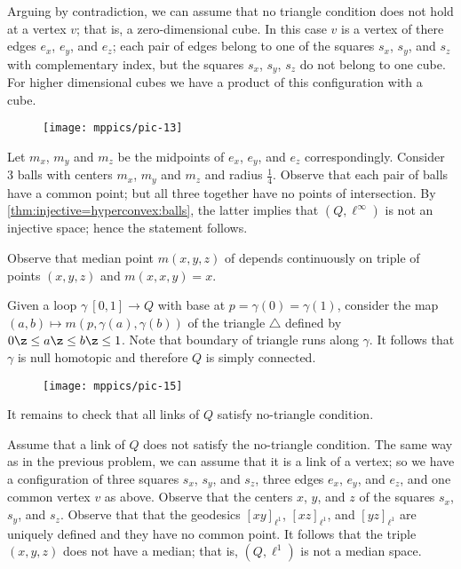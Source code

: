 Arguing by contradiction, we can assume that no triangle condition does not hold at a vertex $v$; that is, a zero-dimensional cube.
In this case $v$ is a vertex of there edges $e_x$, $e_y$, and $e_z$;
each pair of edges belong to one of the squares $s_x$, $s_y$, and $s_z$ with complementary index, but the squares $s_x$, $s_y$, $s_z$ do not belong to one cube.
For higher dimensional cubes we have a product of this configuration with a cube.

\begin{wrapfigure}{r}{25 mm}
\vskip-4mm
\centering
\texttt{[image: mppics/pic-13]}
\end{wrapfigure}

Let $m_x$, $m_y$ and $m_z$ be the midpoints of $e_x$, $e_y$, and $e_z$ correspondingly.
Consider 3 balls with centers $m_x$, $m_y$ and $m_z$ and radius $\tfrac14$.
Observe that each pair of balls have a common point;
but all three together have no points of intersection.
By \ref{thm:injective=hyperconvex:balls}, the latter implies that $(Q,\ell^\infty)$ is not an injective space;
hence the statement follows.


Observe that median point $m(x,y,z)$ of depends continuously on triple of points $(x,y,z)$ and $m(x,x,y)=x$.

Given a loop $\gamma\:[0,1]\to Q$ with base at $p=\gamma(0)=\gamma(1)$,
consider the map $(a,b)\mapsto m(p,\gamma(a),\gamma(b))$ of the triangle $\triangle$ defined by $0\z\le a \z\le b\z\le 1$.
Note that boundary of triangle runs along $\gamma$.
It follows that $\gamma$ is null homotopic and therefore $Q$ is simply connected.

\begin{wrapfigure}{r}{25 mm}
\vskip-4mm
\centering
\texttt{[image: mppics/pic-15]}
\end{wrapfigure}

It remains to check that all links of $Q$ satisfy no-triangle condition.

Assume that a link of $Q$ does not satisfy the no-triangle condition.
The same way as in the previous problem, we can assume that it is a link of a vertex;
so we have a configuration of three squares $s_x$, $s_y$, and $s_z$, 
three edges $e_x$, $e_y$, and $e_z$, and one common vertex $v$ as above.
Observe that the centers $x$, $y$, and $z$ of the squares $s_x$, $s_y$, and $s_z$.
Observe that that the geodesics $[xy]_{\ell^1}$, $[xz]_{\ell^1}$, and $[yz]_{\ell^1}$ are uniquely defined and they have no common point.
It follows that the triple $(x,y,z)$ does not have a median; 
that is, $(Q,\ell^1)$ is not a median space.




